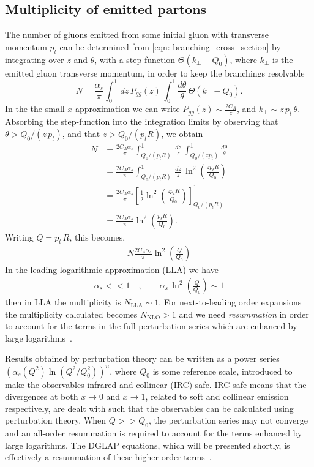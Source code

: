 \documentclass[main.tex]{subfiles}
\begin{document}
\subsection{Multiplicity of emitted partons}
The number of gluons emitted from some initial gluon with transverse momentum \(p_t\) can be determined from \autoref{eqn: branching_cross_section} by integrating over \(z\) and \(\theta\), with a step function \(\Theta(k_\perp -Q_0)\), where \(k_\perp\) is the emitted gluon transverse momentum, in order to keep the branchings resolvable
\begin{equation}
    N = \frac{\alpha_s}{\pi} \int_0^1 \, dz\, P_{gg}(z)\, \int_0^1 \frac{d\theta}{\theta} \, \Theta(k_\perp - Q_0).
\end{equation}
In the the small \(x\) approximation we can write \(P_{gg}(z) \sim \frac{2C_A}{z}\), and \(k_\perp \sim z\, p_t\,\theta\). Absorbing the step-function into the integration limits by observing that \(\theta>Q_0/(z\,p_t)\), and that \(z > Q_0/(p_t R)\), we obtain
\begin{align}\label{eqn: spectrum_emitted_gluonsonly}
    N &= \frac{2C_A \alpha_s}{\pi} \int_{Q_0/(p_tR)}^1 \, \frac{dz}{z}\, \int_{Q_0/(zp_t)}^1 \frac{d\theta}{\theta} \nonumber \\
    &= \frac{2C_A \alpha_s}{\pi} \int_{Q_0/(p_tR)}^1 \, \frac{dz}{z}\, \ln^2\left(\frac{zp_t R}{Q_0}\right) \nonumber \\
    &= \frac{2C_A \alpha_s}{\pi} \left[\frac{1}{2} \ln^2 \left(\frac{zp_t R}{Q_0}\right) \right]_{Q_0/(p_tR)}^1 \nonumber \\
    &= \frac{2C_A \alpha_s}{\pi} \ln^2 \left(\frac{p_t R}{Q_0} \right) .
\end{align}
Writing \(Q = p_t\,R\), this becomes, 
\begin{align}
    N \frac{2C_A \alpha_s}{\pi} \ln^2 \left(\frac{Q}{Q_0} \right)
\end{align}
In the leading logarithmic approximation (LLA) we have 
\begin{align}
    \alpha_s << 1 \quad, \qquad \alpha_s\, \ln^2\left( \frac{Q}{Q_0}\right) \sim 1
\end{align}
then in LLA the multiplicity is \(N_{\text{LLA}}\sim 1\). For next-to-leading order expansions the multiplicity calculated becomes \(N_{\text{NLO}}>1\) and we need \emph{resummation} in order to account for the terms in the full perturbation series which are enhanced by large logarithms~\cite{Caucal:2020zcz}. 

Results obtained by perturbation theory can be written as a power series \(\left( \alpha_s(Q^2) \ln(Q^2/Q_0^2) \right)^n\), where \(Q_0\) is some reference scale, introduced to make the observables infrared-and-collinear (IRC) safe. IRC safe means that the divergences at both \(x\rightarrow 0\) and \(x\rightarrow 1\), related to soft and collinear emission respectively, are dealt with such that the observables can be calculated using perturbation theory. When \(Q>>Q_0\), the perturbation series may not converge and an all-order resummation is required to account for the terms enhanced by large logarithms. The DGLAP equations, which will be presented shortly, is effectively a resummation of these higher-order terms~\cite{Resummation}.
\end{document}
